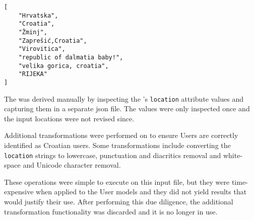 \begin{code}
\label{methods:sdlc-inputs-locations}
\begin{verbatim}
[
    "Hrvatska",
    "Croatia",
    "Žminj",
    "Zaprešić,Croatia",
    "Virovitica",
    "republic of dalmatia baby!",
    "velika gorica, croatia",
    "RIJEKA"
]
\end{verbatim}
\end{code}

The  was derived manually by inspecting the 's \texttt{location} attribute values and capturing them in a separate \acrshort{json} file. The values were only inspected once and the input locations were not revised since. 

Additional transformations were performed on  to ensure Users are correctly identified as Croatian users. Some transformations include converting the \texttt{location} strings to lowercase, punctuation and diacritics removal and white-space and Unicode character removal. 

These operations were simple to execute on this input file, but they were time-expensive when applied to the User models and they did not yield results that would justify their use. After performing this due diligence, the additional transformation functionality was discarded and it is no longer in use.
